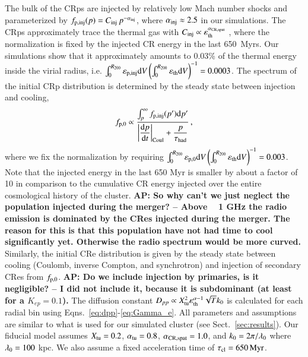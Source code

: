 \documentclass[fleqn,usenatbib,useAMS]{mnras}
\newcommand{\eps}{\varepsilon}
\def\AP2#1{{\bf  AP2: #1}}
\def\AP#1{{\bf {\color{blue} AP: #1}}}
\begin{document}
The bulk of the CRps are injected by relatively low Mach number shocks
and parameterized by $f_{\mathrm{p,inj}}(p) =
C_{\mathrm{inj}}\,p^{-\alpha_{\mathrm{inj}}}$, where $\alpha_{\mathrm{inj}}\approx
2.5$ in our simulations. The CRps approximately trace the thermal gas
with $C_\rmn{inj} \propto \eps_\rmn{th}^{\alpha_\rmn{CR,spat}}$
\citep{pinzke10,2016MNRAS.459...70V}, where the normalization is fixed
by the injected CR energy in the last 650~Myrs. Our simulations show
that it approximately amounts to 0.03\% of the thermal energy inside
the virial radius, i.e.  $\int_0^{R_{200}}\eps_\rmn{p,inj} \rmn{d}
V\left(\int_0^{R_{200}}\eps_\rmn{th} \rmn{d}V\right)^{-1} =
0.0003$. The spectrum of the initial CRp distribution is determined by
the steady state between injection and cooling,
\begin{equation}
 f_{\mathrm{p,0}} \propto \frac{\int_p^\infty f_{\mathrm{p,inj}}(p') 
{\mathrm{d}}p'}{\displaystyle\left|{{{\mathrm{d}}p}\over{{\mathrm{d}}t}}\right|_{\rm Coul}+\frac{p}{\tau_{\rm had}}}\,,
\end{equation}
where we fix the normalization by requiring
$\int_0^{R_{200}}\eps_\rmn{p,0}
\rmn{d}V\left(\int_0^{R_{200}}\eps_\rmn{th} \rmn{d}V\right)^{-1} =
0.003$. Note that the injected energy in the last 650 Myr is smaller
by about a factor of 10 in comparison to the cumulative CR energy
injected over the entire cosmological history of the cluster. \AP{So why can't we just neglect the population injected during the merger? -- Above ~ 1 GHz the radio emission is dominated by the CRes injected during the merger. The reason for this is that this population have not had time to cool significantly yet. Otherwise the radio spectrum would be more curved.}  
Similarly, the initial CRe distribution is given by the steady state
between cooling (Coulomb, inverse Compton, and synchrotron) and
injection of secondary CRes from $f_{\mathrm{p,0}}$. %
\AP{Do we include injection by primaries, is it negligible? -- I did
  not include it, because it is subdominant (at least for a
  $K_{ep}=0.1$).}  The diffusion constant $D_{pp} \propto X_{\rm tu}^{2}
\eps_{\rm th}^{\alpha-1} \sqrt{T} k_{\rm 0}$ is calculated for each
radial bin using Eqns.~\ref{eq:dpp}-\ref{eq:Gamma_e}. All parameters
and assumptions are similar to what is used for our simulated cluster
(see Sect.~\ref{sec:results}). Our fiducial model assumes $X_{\rm tu}
= 0.2$, $\alpha_{\rm tu} =0.8$, $\alpha_{\rm CR, spat}=1.0$, and
$k_{\rm 0}=2 \pi/\lambda_{\rm 0}$ where $\lambda_{\rm 0}=100$ kpc. We
also assume a fixed acceleration time of $\tau_{\rm cl} = 650 \, {\rm
  Myr}$.
\end{document}
